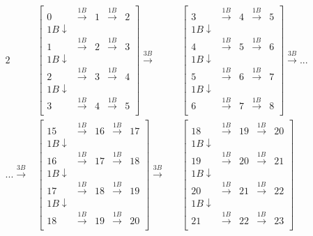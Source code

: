 \documentclass[oneside, 12pt]{report}
\begin{document}
\begin{figure}[H]
\begin{alignat*}{2}
&\begin{bmatrix}
0 & \xrightarrow{1B} & 1 &\xrightarrow{1B} & 2 \\
1B \downarrow \\
1 & \xrightarrow{1B} & 2 &\xrightarrow{1B} & 3 \\
1B \downarrow \\
2 & \xrightarrow{1B} & 3 &\xrightarrow{1B} & 4 \\
1B \downarrow \\
3 & \xrightarrow{1B} & 4 &\xrightarrow{1B} & 5 \\
\end{bmatrix}
%
\xrightarrow{3B}
&&\begin{bmatrix}
3 & \xrightarrow{1B} & 4 &\xrightarrow{1B} & 5 \\
1B \downarrow \\
4 & \xrightarrow{1B} & 5 &\xrightarrow{1B} & 6 \\
1B \downarrow \\
5 & \xrightarrow{1B} & 6 &\xrightarrow{1B} & 7 \\
1B \downarrow \\
6 & \xrightarrow{1B} & 7 &\xrightarrow{1B} & 8 \\
\end{bmatrix}
%
\xrightarrow{3B} ... \\ 
... \xrightarrow{3B}
&\begin{bmatrix}
15 & \xrightarrow{1B} & 16 &\xrightarrow{1B} & 17 \\
1B \downarrow \\
16 & \xrightarrow{1B} & 17 &\xrightarrow{1B} & 18 \\
1B \downarrow \\
17 & \xrightarrow{1B} & 18 &\xrightarrow{1B} & 19 \\
1B \downarrow \\
18 & \xrightarrow{1B} & 19 &\xrightarrow{1B} & 20 \\
\end{bmatrix}
%
\xrightarrow{3B}
&&\begin{bmatrix}
18 & \xrightarrow{1B} & 19 &\xrightarrow{1B} & 20 \\
1B \downarrow \\
19 & \xrightarrow{1B} & 20 &\xrightarrow{1B} & 21 \\
1B \downarrow \\
20 & \xrightarrow{1B} & 21 &\xrightarrow{1B} & 22 \\
1B \downarrow \\
21 & \xrightarrow{1B} & 22 &\xrightarrow{1B} & 23 \\
\end{bmatrix}
\end{alignat*}
\end{figure}
\end{document}
